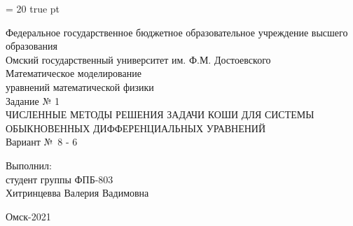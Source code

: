 \documentclass[12pt,a4paper]{article}
\begin{document}
	
	\graphicspath{{figures/}}
	
	\baselineskip = 20 true pt \vspace{40mm} \large
	\begin{titlepage}
		\begin{center}
			Федеральное государственное бюджетное образовательное учреждение высшего образования\\[0.5cm]
			Омский государственный университет им. Ф.М. Достоевского\\[4.5cm]
			
			Математическое моделирование\\ уравнений математической физики\\[2cm]
			Задание № 1\\[1cm]
			\uppercase{{\large{
						Численные методы решения задачи Коши для системы обыкновенных дифференциальных уравнений
			}}}\\[3cm]
			Вариант №\ 8 - 6\\[2cm]
		\end{center}
		
		\begin{flushright}
			Выполнил:\\
			студент группы ФПБ-803\\
			Хитринцевва Валерия Вадимовна\\[3cm]
		\end{flushright}
		
		\begin{center}
			Омск-2021
		\end{center}
	\end{titlepage}
	
	\setcounter{page}{2} 
	\tableofcontents
	\newpage
	
	\newpage
\end{document}
